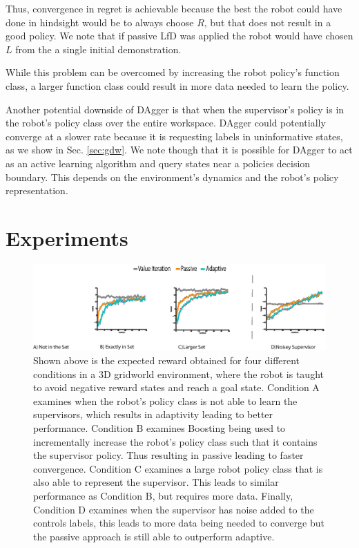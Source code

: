 \documentclass[10pt, conference]{ieeeconf}      %
\begin{document}
Thus, convergence in regret is achievable because the best the robot could have done in hindsight would be to always choose $R$, but that does not result in a good policy. We note that if passive LfD was applied the robot would have chosen $L$ from the a single initial demonstration. 

 While this problem can be overcomed by increasing the robot policy's function class, a larger function class could result in more data needed to learn the policy\cite{kakade2009generalization}.
 
Another potential downside of DAgger is that when the supervisor's policy is in the robot's policy class over the entire workspace. DAgger could potentially converge at a slower rate because it is requesting labels in uninformative states, as we show in Sec. \ref{sec:gdw}. We note though that it is possible for DAgger to act as an active learning algorithm and query states near a policies decision boundary. This depends on the environment's dynamics and the robot's policy representation. 





\section{Experiments}

\begin{figure}
\includegraphics{f_figs/var_grid.eps}
\caption{
    \footnotesize
Shown above is the expected reward obtained for four different conditions in a 3D gridworld environment, where the robot is taught to avoid negative reward states and reach a goal state. Condition A examines when the robot's policy class is not able to learn the supervisors, which results in adaptivity leading to better performance. Condition B examines Boosting being used to incrementally increase the robot's policy class such that it contains the supervisor policy. Thus resulting in passive leading to faster convergence. Condition C examines a large robot policy class that is also able to represent the supervisor. This leads to similar performance as Condition B, but requires more data. Finally, Condition D examines when the supervisor has noise added to the controls labels, this leads to more data being needed to converge but the passive approach is still able to outperform adaptive.  }
\vspace*{-20pt}
\label{fig:var}
\end{figure}
\end{document}
